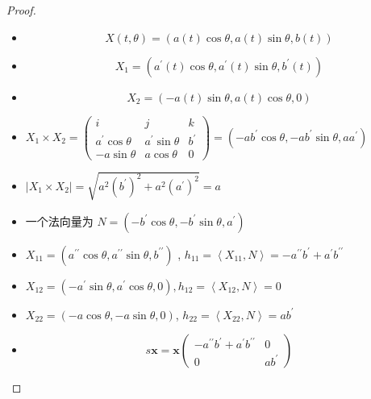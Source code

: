 \documentclass[../../几何与拓扑.tex]{subfiles}
\begin{document}
\begin{proof}
    \begin{itemize}
        \item  \[
            X\left( t, \theta  \right)= \left( a\left( t \right)\cos  \theta , a\left( t \right)\sin  \theta ,b\left( t \right)   \right)  
            \]
            \item \[
            X_1= \left( a^{\prime} \left( t \right)\cos  \theta ,a^{\prime} \left( t \right)\sin  \theta ,b^{\prime} \left( t \right)    \right) 
            \]
            \item \[
            X_2= \left( -a\left( t \right)\sin  \theta , a\left( t \right)\cos  \theta , 0   \right)  
            \] 
            \item  \(  X_1\times X_2= \begin{pmatrix} 
                i&j&k\\ 
                 a^{\prime} \cos  \theta &a^{\prime} \sin  \theta &b^{\prime} \\ 
                  -a\sin  \theta &a\cos  \theta &0 
            \end{pmatrix}=  \left( -ab^{\prime} \cos  \theta ,-ab^{\prime} \sin  \theta ,aa^{\prime}  \right)    \) 
            \item \(  \left| X_1\times X_2 \right|=  \sqrt{a^{2}\left( b^{\prime}  \right)^{2} + a^{2}\left( a^{\prime}  \right)^{2}  }   = a\)
            \item 一个法向量为 \(  N =  \left( -b^{\prime} \cos  \theta ,-b^{\prime} \sin  \theta ,a^{\prime}  \right)   \)  
            \item \(  X_{11}= \left( a^{\prime \prime} \cos  \theta ,a^{\prime \prime} \sin  \theta ,b^{\prime \prime}  \right)   \) , \(  h_{11}= \left<X_{11},N \right> =-a ^{\prime \prime} b^{\prime} + a^{\prime} b^{\prime \prime}   \)
            \item \(  X_{12}= \left( -a^{\prime} \sin  \theta , a^{\prime} \cos  \theta ,0 \right), h_{12}= \left<X_{12},N \right>= 0   \)
            \item \(  X_{22}= \left( -a\cos  \theta ,-a\sin  \theta ,0 \right)   \), \(  h_{22}= \left<X_{22},N \right>=  ab^{\prime}   \)   
            \item  \[
            s \mathbf{x}= \mathbf{x} \begin{pmatrix} 
                -a^{\prime \prime} b^{\prime} + a^{\prime} b^{\prime \prime} & 0\\ 
                 0& ab^{\prime}  
            \end{pmatrix} 
\]
\end{itemize}
\end{proof}
\end{document}
